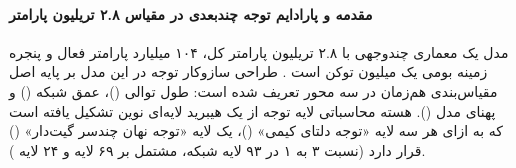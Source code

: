 \item {}

\paragraph*{مقدمه و پارادایم توجه چندبعدی در مقیاس ۲.۸ تریلیون پارامتر}
مدل  یک معماری چندوجهی با ۲.۸ تریلیون پارامتر کل، ۱۰۴ میلیارد پارامتر فعال و پنجره زمینه بومی یک میلیون توکن است \cite{kimi2026k3}. طراحی سازوکار توجه در این مدل بر پایه اصل مقیاس‌بندی هم‌زمان در سه محور تعریف شده است: طول توالی ()، عمق شبکه () و پهنای مدل (). هسته محاسباتی لایه توجه از یک هیبرید لایه‌ای نوین تشکیل یافته است که به ازای هر سه لایه «توجه دلتای کیمی» ()، یک لایه «توجه نهان چندسر گیت‌دار» () قرار دارد (نسبت ۳ به ۱ در ۹۳ لایه شبکه، مشتمل بر ۶۹ لایه  و ۲۴ لایه ).

